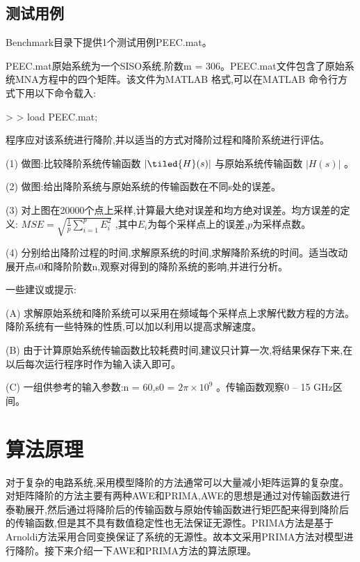 \documentclass[12pt]{article}
\begin{document}
\begin{sloppypar}
\subsection{测试用例}
\qquad Benchmark目录下提供1个测试用例PEEC.mat。

\qquad PEEC.mat原始系统为一个SISO系统,阶数m = 306。PEEC.mat文件包含了原始系统MNA方程中的四个矩阵。该文件为MATLAB 格式,可以在MATLAB 命令行方式下用以下命令载入:

\qquad > > load PEEC.mat;

\qquad 程序应对该系统进行降阶,并以适当的方式对降阶过程和降阶系统进行评估。

\qquad (1) 做图:比较降阶系统传输函数 $\left| \tiled{H}(s) \right|$ 与原始系统传输函数 $|H(s)|$ 。 \par
\qquad (2) 做图:给出降阶系统与原始系统的传输函数在不同s处的误差。 \par
\qquad (3) 对上图在20000个点上采样,计算最大绝对误差和均方绝对误差。均方误差的定义: $MSE=\sqrt{\frac{1}{p} \sum_{i=1}^p E_i^2}$ ,其中$E_i$为每个采样点上的误差,$p$为采样点数。 \par
\qquad (4) 分别给出降阶过程的时间,求解原系统的时间,求解降阶系统的时间。适当改动展开点s0和降阶阶数n,观察对得到的降阶系统的影响,并进行分析。 \par
\qquad 一些建议或提示: \par
\qquad (A) 求解原始系统和降阶系统可以采用在频域每个采样点上求解代数方程的方法。降阶系统有一些特殊的性质,可以加以利用以提高求解速度。 \par
\qquad (B) 由于计算原始系统传输函数比较耗费时间,建议只计算一次,将结果保存下来,在以后每次运行程序时作为输入读入即可。 \par
\qquad (C) 一组供参考的输入参数:n = 60,s0 = $2\pi \times 10^9$ 。传输函数观察0 – 15 GHz区间。 \par


\newpage
\section{算法原理}

\qquad 对于复杂的电路系统,采用模型降阶的方法通常可以大量减小矩阵运算的复杂度。对矩阵降阶的方法主要有两种AWE和PRIMA,AWE的思想是通过对传输函数进行泰勒展开,然后通过将降阶后的传输函数与原始传输函数进行矩匹配来得到降阶后的传输函数,但是其不具有数值稳定性也无法保证无源性。PRIMA方法是基于Arnoldi方法采用合同变换保证了系统的无源性。故本文采用PRIMA方法对模型进行降阶。接下来介绍一下AWE和PRIMA方法的算法原理。



\end{sloppypar}
\end{document}
